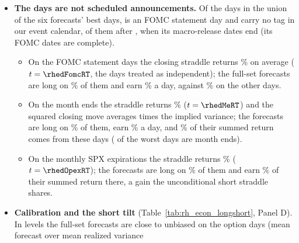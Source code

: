 \begin{itemize}
\begin{itemize}
    gain over the short straddle, so the other long days lose on balance.
  \item The largest, \rhedTopDate, returned \rhedTopR\% of the premium on a closing-half-hour move of
    \rhedTopMove\% (realized variance \rhedTopRVIV{} times the implied), \rhedTopShareMin--\rhedTopShareMax\% of each
    full-set strategy's summed return.
  \item Against the HAR twin the gain is less concentrated: without the forecast's ten best days the Sharpe ratio gain
    falls from \rhedDHarAllMin--\rhedDHarAllMax{} to \rhedDHarExBestMin--\rhedDHarExBestMax, and those days carry
    \rhedHarBestShareMin--\rhedHarBestShareMax\% of the summed return gain over the twin.
  \end{itemize}
\item \textbf{The days are not scheduled announcements.} Of the \rhedBestUnion{} days in the union of the six
  forecasts' best days, \rhedBestFomcN{} is an FOMC statement day and \rhedBestNoTagN{} carry no tag in our event
  calendar, \rhedBestAfterRelN{} of them after \rhedRelEndText, when its macro-release dates end (its FOMC dates are
  complete).
  \begin{itemize}
  \item On the \rhedFomcN{} FOMC statement days the closing straddle returns \rhedFomcR\% on average
    ($t = \rhedFomcRT$, the days treated as independent); the full-set forecasts are long on \rhedFomcLong\% of them
    and earn \rhedFomcStrat\% a day, against \rhedFomcOtherStrat\% on the other days.
  \item On the \rhedMeN{} month ends the straddle returns \rhedMeR\% ($t = \rhedMeRT$) and the squared closing move
    averages \rhedMeMoveSqIV{} times the implied variance; the forecasts are long on \rhedMeLong\% of them, earn
    \rhedMeStrat\% a day, and \rhedMeShare\% of their summed return comes from these days (\rhedWorstMeN{} of the worst days
    are month ends).
  \item On the \rhedOpexN{} monthly SPX expirations the straddle returns \rhedOpexR\% ($t = \rhedOpexRT$); the
    forecasts are long on \rhedOpexLong\% of them and earn \rhedOpexShare\% of their summed return there, a gain the
    unconditional short straddle shares.
  \end{itemize}
\item \textbf{Calibration and the short tilt} (Table~\ref{tab:rh_econ_longshort}, Panel D). In levels the full-set
  forecasts are close to unbiased on the option days (mean forecast over mean realized variance

\end{itemize}
